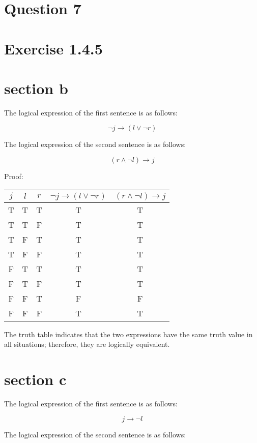 \documentclass[10pt]{article}
\begin{document}
\pagebreak
\section*{Question 7}
\section*{Exercise 1.4.5}
\section*{section b}

The logical expression of the first sentence is as follows:

$$
\neg j \rightarrow(l \vee \neg r)
$$

The logical expression of the second sentence is as follows:

$$
(r \wedge \neg l) \rightarrow j
$$

Proof:

\begin{center}
\begin{tabular}{|c|c|c|c|c|}
\hline
$j$ & $l$ & $r$ & $\neg j \rightarrow(l \vee \neg r)$ & $(r \wedge \neg l) \rightarrow j$ \\
\hline
T & T & T & T & T \\
\hline
T & T & F & T & T \\
\hline
T & F & T & T & T \\
\hline
T & F & F & T & T \\
\hline
F & T & T & T & T \\
\hline
F & T & F & T & T \\
\hline
F & F & T & F & F \\
\hline
F & F & F & T & T \\
\hline
\end{tabular}
\end{center}

The truth table indicates that the two expressions have the same truth value in all situations; therefore, they are logically equivalent.

\section*{section c}
The logical expression of the first sentence is as follows:

$$
j \rightarrow \neg l
$$

The logical expression of the second sentence is as follows:
\end{document}
